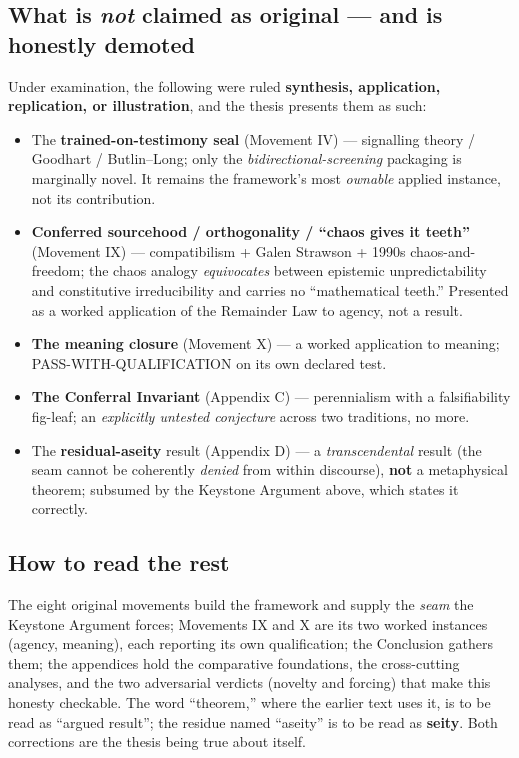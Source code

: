 \documentclass[11pt]{article}
\begin{document}
\subsection*{What is \emph{not} claimed as original — and is honestly demoted}

Under examination, the following were ruled \textbf{synthesis, application, replication, or illustration}, and the thesis presents them as such:

\begin{itemize}
\item The \textbf{trained-on-testimony seal} (Movement IV) — signalling theory /\allowbreak{} Goodhart /\allowbreak{} Butlin–Long; only the \emph{bidirectional-screening} packaging is marginally novel. It remains the framework's most \emph{ownable} applied instance, not its contribution.
\item \textbf{Conferred sourcehood /\allowbreak{} orthogonality /\allowbreak{} ``chaos gives it teeth''} (Movement IX) — compatibilism + Galen Strawson + 1990s chaos-and-freedom; the chaos analogy \emph{equivocates} between epistemic unpredictability and constitutive irreducibility and carries no ``mathematical teeth.'' Presented as a worked application of the Remainder Law to agency, not a result.
\item \textbf{The meaning closure} (Movement X) — a worked application to meaning; PASS-WITH-QUALIFICATION on its own declared test.
\item \textbf{The Conferral Invariant} (Appendix C) — perennialism with a falsifiability fig-leaf; an \emph{explicitly untested conjecture} across two traditions, no more.
\item The \textbf{residual-aseity} result (Appendix D) — a \emph{transcendental} result (the seam cannot be coherently \emph{denied} from within discourse), \textbf{not} a metaphysical theorem; subsumed by the Keystone Argument above, which states it correctly.
\end{itemize}

\subsection*{How to read the rest}

The eight original movements build the framework and supply the \emph{seam} the Keystone Argument forces; Movements IX and X are its two worked instances (agency, meaning), each reporting its own qualification; the Conclusion gathers them; the appendices hold the comparative foundations, the cross-cutting analyses, and the two adversarial verdicts (novelty and forcing) that make this honesty checkable. The word ``theorem,'' where the earlier text uses it, is to be read as ``argued result''; the residue named ``aseity'' is to be read as \textbf{seity}. Both corrections are the thesis being true about itself.
\end{document}

